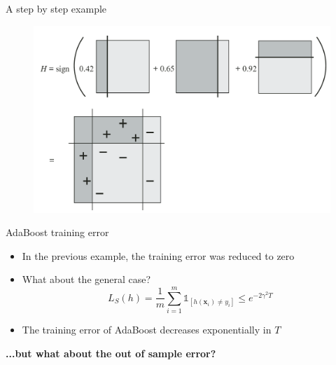 \begin{frame}{A step by step example}
    \begin{figure}
        \includegraphics[width=\textwidth]{img/example_result}
    \end{figure}
\end{frame}

\begin{frame}{AdaBoost training error}
    \begin{itemize} \pause
        \item In the previous example, the training error was reduced to zero \pause
        \item What about the general case? \pause
        \begin{equation*}
            L_S(h) = \frac{1}{m} \sum_{i=1}^m \mathds{1}_{\left[ h(\mathbf{x}_i) \neq y_i \right]} \leq e^{-2 \gamma^2 T}
        \end{equation*} \pause
        \item The training error of AdaBoost decreases exponentially in $T$ \pause
    \end{itemize}
    \textbf{...but what about the out of sample error?}
\end{frame}

